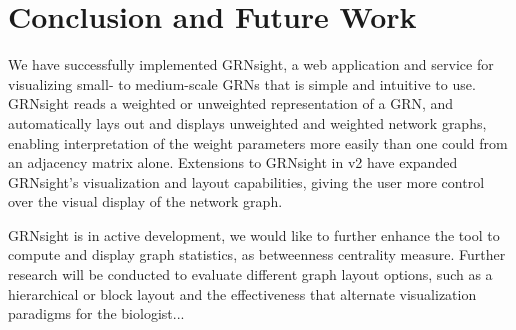 \documentclass[sigconf,review]{acmart}
\begin{document}
\section{Conclusion and Future Work}
We have successfully implemented GRNsight, a web application and service for visualizing small- to medium-scale GRNs that is simple and intuitive to use. GRNsight reads a weighted or unweighted representation of a GRN, and automatically lays out and displays unweighted and weighted network graphs, enabling interpretation of the weight parameters more easily than one could from an adjacency matrix alone. Extensions to GRNsight in v2 have expanded GRNsight's visualization and layout capabilities, giving the user more control over the visual display of the network graph.

GRNsight is in active development, we would like to further enhance the tool to compute and display graph statistics, as betweenness centrality measure. Further research will be conducted to evaluate different graph layout options, such as a hierarchical or block layout and the effectiveness that alternate visualization paradigms for the biologist...


 
\end{document}
